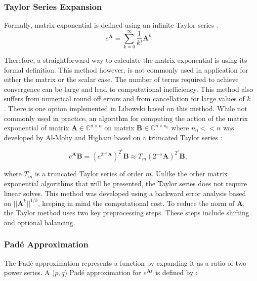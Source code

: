 \subsubsection{Taylor Series Expansion}
Formally,  matrix exponential is defined using an infinite Taylor series \cite{exokit} \cite{moler2003} \cite{pusa2010}. 
\begin{equation}
    e^{\boldsymbol{A}} = \sum_{k = 0}^{\infty}\frac{1}{k!}\boldsymbol{A}^{k}
    \label{eq:power_series_exp}
\end{equation}

\noindent Therefore, a straightforward way to calculate the matrix exponential is using its formal definition. This method however, is not commonly used in application for either the matrix or the scalar case. The number of terms required to achieve convergence can be large and lead to computational inefficiency. This method also suffers from numerical round off errors and from cancellation for large values of $k$ \cite{moler2003}. There is one option implemented in Libowski based on this method. While not commonly used in practice, an algorithm for computing the action of the matrix exponential of matrix $\boldsymbol{A} \in \mathbb{C}^{n\times n}$ on matrix $\boldsymbol{B} \in \mathbb{C}^{n\times n_{0}}$ where $n_{0} << n$ was developed by Al-Mohy and Higham based on a truncated Taylor series \cite{higham2011}:

\begin{equation}
    e^{\boldsymbol{A}}\boldsymbol{B} = (e^{2^{-s}\boldsymbol{A}})^{2^{s}}\boldsymbol{B} \approx T_{m}(2^{-s}\boldsymbol{A})^{2^{s}}\boldsymbol{B},
\end{equation}

\noindent where $T_{m}$ is a truncated Taylor series of order $m$. Unlike the other matrix exponential algorithms that will be presented, the Taylor series does not require linear solves. This method was developed using a backward error analysis based on $||\boldsymbol{A}^{k}||^{1/k}$, keeping in mind the computational cost. To reduce the norm of $\boldsymbol{A}$, the Taylor method uses two key preprocessing steps. These steps include shifting and optional balancing. 


\subsubsection{Pad\'e Approximation}
The Pad\'e approximation represents a function by expanding it as a ratio of two power series. A ($p,q$) Pad\'e approximation for $e^{\boldsymbol{A}t}$ is defined by \cite{moler2003}:

